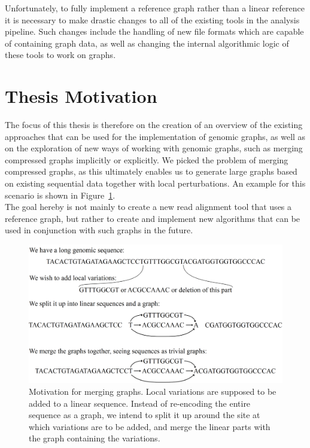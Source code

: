 \documentclass[a4paper,12pt,twoside,BCOR=10mm]{scrbook}
\begin{document}
Unfortunately, to fully implement a reference graph rather than a linear reference
it is necessary to make drastic changes to all of the existing tools in the analysis pipeline.
Such changes include the handling of new file formats which are capable of containing graph data,
as well as changing the internal algorithmic logic of these tools to work on graphs.

\section{Thesis Motivation}

The focus of this thesis is therefore on the creation of an overview of the existing
approaches that can be used for the implementation of genomic graphs,
as well as on the exploration of new ways of working with genomic graphs,
such as merging compressed graphs implicitly or explicitly.
We picked the problem of merging compressed graphs,
as this ultimately enables us to generate large graphs
based on existing sequential data together with local perturbations.
An example for this scenario is shown in Figure~\ref{fig:evo_fig_add_perturbations_to_long_seq}. \\
The goal hereby is not mainly to create a new read alignment tool that uses
a reference graph, but rather to create and implement new algorithms that can
be used in conjunction with such graphs in the future.

\begin{figure}[!htb]
\centering
\includegraphics[width=\textwidth]{evo_fig_add_perturbations_to_long_seq.png}
\caption[Motivation for merging graphs]{Motivation for merging graphs. Local variations are supposed to be added to a linear sequence. Instead of re-encoding the entire sequence as a graph, we intend to split it up around the site at which variations are to be added, and merge the linear parts with the graph containing the variations.} \label{fig:evo_fig_add_perturbations_to_long_seq}
\end{figure}
\end{document}
